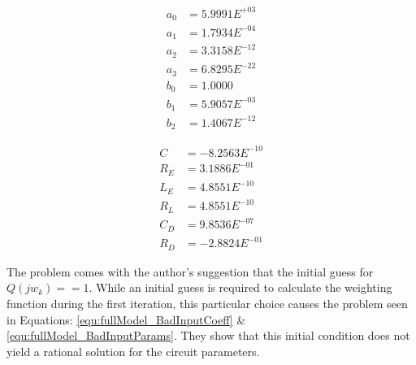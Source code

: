 \begin{multicols}{2}
    \begin{equation}
        \label{equ:fullModel_BadOutputCoeff}
        \begin{split}
             a_0 &= 5.9991E^{+03} \\
             a_1 &= 1.7934E^{-04} \\
             a_2 &= 3.3158E^{-12} \\
             a_3 &= 6.8295E^{-22} \\
             b_0 &= 1.0000        \\
             b_1 &= 5.9057E^{-03} \\
             b_2 &= 1.4067E^{-12}
        \end{split}
    \end{equation}

    \begin{equation}
        \label{equ:fullModel_BadOutputParams}
        \begin{split}
            C &= -8.2563E^{-10} \\
            R_E &=  3.1886E^{-01} \\
            L_E &=  4.8551E^{-10} \\
            R_L &=  4.8551E^{-10} \\
            C_D &=  9.8536E^{-07} \\
            R_D &= -2.8824E^{-01}
        \end{split}
    \end{equation}
\end{multicols}

The problem comes with the author's \cite{levy_iter} suggestion that the initial guess for $Q(jw_k) == 1$. While an initial guess is required to calculate the weighting function during the first iteration, this particular choice causes the problem seen in Equations: \eqref{equ:fullModel_BadInputCoeff} \& \eqref{equ:fullModel_BadInputParams}. They show that this initial condition does not yield a rational solution for the circuit parameters.


